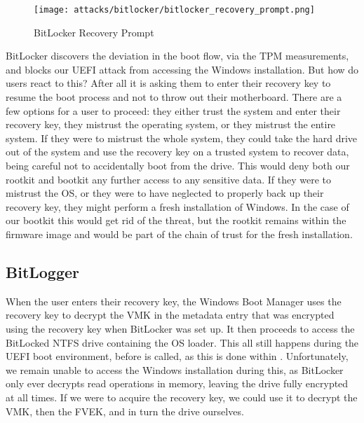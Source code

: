 \begin{figure}[htb]
    \centering
    \texttt{[image: attacks/bitlocker/bitlocker\_recovery\_prompt.png]}
    \caption{BitLocker Recovery Prompt}
    \label{fig:bitlocker-recovery-prompt}
\end{figure}

BitLocker discovers the deviation in the boot flow, via the \ac{TPM} measurements, and blocks our \ac{UEFI} attack from accessing the Windows installation.
But how do users react to this?
After all it is asking them to enter their recovery key to resume the boot process and not to throw out their motherboard.
There are a few options for a user to proceed: they either trust the system and enter their recovery key, they mistrust the operating system, or they mistrust the entire system.
If they were to mistrust the whole system, they could take the hard drive out of the system and use the recovery key on a trusted system to recover data, being careful not to accidentally boot from the drive.
This would deny both our rootkit and bootkit any further access to any sensitive data.
If they were to mistrust the \ac{OS}, or they were to have neglected to properly back up their recovery key, they might perform a fresh installation of Windows.
In the case of our bootkit this would get rid of the threat, but the rootkit remains within the firmware image and would be part of the chain of trust for the fresh installation.

\subsection{BitLogger}

When the user enters their recovery key, the Windows Boot Manager uses the recovery key to decrypt the \ac{VMK} in the metadata entry that was encrypted using the recovery key when BitLocker was set up.
It then proceeds to access the BitLocked \ac{NTFS} drive containing the  \ac{OS} loader.
This all still happens during the \ac{UEFI} boot environment, before  is called, as this is done within .
Unfortunately, we remain unable to access the Windows installation during this, as BitLocker only ever decrypts read operations in memory, leaving the drive fully encrypted at all times.
If we were to acquire the recovery key, we could use it to decrypt the \ac{VMK}, then the \ac{FVEK}, and in turn the drive ourselves.

